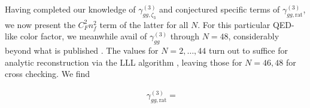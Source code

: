 \documentclass[
 twocolumn,
 superscriptaddress,
 preprintnumbers,
 nofootinbib,
 amsmath,amssymb,
 aps,
 prl
 ]{revtex4-2}
\begin{document}
Having completed our knowledge of $\gamma_{gg,\zeta_3}^{(3)}$ and conjectured specific terms of $\gamma_{gg,\mathrm{rat}}^{(3)}$, we now present the $C_F^2n_f^2$ term of the latter for all $N$.
For this particular QED-like color factor, we meanwhile avail of $\gamma_{gg}^{(3)}$ through $N=48$, considerably beyond what is published \cite{Moch:2021qrk,Moch:2023tdj,Falcioni:2024qpd,Falcioni:2025hfz}.
The values for $N=2,\ldots,44$ turn out to suffice for analytic reconstruction via the LLL algorithm \cite{Lenstra82factoringpolynomials,fplll}, leaving those for $N=46,48$ for cross checking.
We find
\begin{widetext}
\begin{eqnarray}
&&\gamma_{gg,\mathrm{rat}}^{(3)}=






\end{eqnarray}
\end{widetext}
\end{document}

